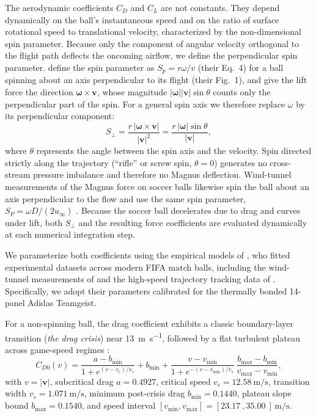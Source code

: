 \documentclass[10pt,a4paper]{article}
\begin{document}
The aerodynamic coefficients $C_D$ and $C_L$ are not constants. They depend
dynamically on the ball's instantaneous speed and on the ratio of surface
rotational speed to translational velocity, characterized by the non-dimensional
spin parameter. Because only the component of angular velocity orthogonal to the
flight path deflects the oncoming airflow, we define the perpendicular spin parameter. \citet{kiratidis2018} define the spin parameter as
$S_p = r\omega/v$ (their Eq.~4) for a ball spinning about an axis perpendicular
to its flight (their Fig.~1), and give the lift force the direction
$\bm{\omega}\times\bm{v}$, whose magnitude $|\bm{\omega}||\bm{v}|\sin\theta$
counts only the perpendicular part of the spin. For a general spin axis we
therefore replace $\omega$ by its perpendicular component:
\begin{equation}
  S_\perp = \frac{r\,|\bm{\omega}\times\bm{v}|}{|\bm{v}|^2}
          = \frac{r\,|\bm{\omega}|\sin\theta}{|\bm{v}|},
  \label{eq:sperp}
\end{equation}
where $\theta$ represents the angle between the spin axis and the velocity. Spin
directed strictly along the trajectory (``rifle'' or screw spin, $\theta = 0$)
generates no cross-stream pressure imbalance and therefore no Magnus deflection.
Wind-tunnel measurements of the Magnus force on soccer balls likewise spin the
ball about an axis perpendicular to the flow and use the same spin parameter,
$S_P = \omega D/(2u_\infty)$ \citep{kray2014}. Because the soccer ball decelerates due
to drag and curves under lift, both $S_\perp$ and the resulting force
coefficients are evaluated dynamically at each numerical integration step.

We parameterize both coefficients using the empirical models of
\citet{kiratidis2018}, who fitted experimental datasets across modern FIFA match
balls, including the wind-tunnel measurements of \citet{asai2007} and the
high-speed trajectory tracking data of \citet{goff2010}. Specifically, we adopt
their parameters calibrated for the thermally bonded 14-panel Adidas Teamgeist.

For a non-spinning ball, the drag coefficient exhibits a classic boundary-layer
transition (\emph{the drag crisis}) near \SI{13}{\metre\per\second}, followed by
a flat turbulent plateau across game-speed regimes \citep[Eq.~5]{kiratidis2018}:
\begin{equation}
  C_{D0}(v) = \frac{a - b_{\min}}{1 + e^{(v - v_c)/v_s}} + b_{\min}
  + \frac{v - v_{\min}}{1 + e^{-(v - v_{\min})/v_s}}\,
    \frac{b_{\max} - b_{\min}}{v_{\max} - v_{\min}},
  \label{eq:cd0}
\end{equation}
with $v = |\bm{v}|$, subcritical drag $a = 0.4927$, critical speed
$v_c = \SI{12.58}{\metre\per\second}$, transition width
$v_s = \SI{1.071}{\metre\per\second}$, minimum post-crisis drag
$b_{\min} = 0.1440$, plateau slope bound $b_{\max} = 0.1540$, and speed interval
$[v_{\min}, v_{\max}] = [\SI{23.17}{}, \SI{35.00}{}]\,\si{\metre\per\second}$.
\end{document}
